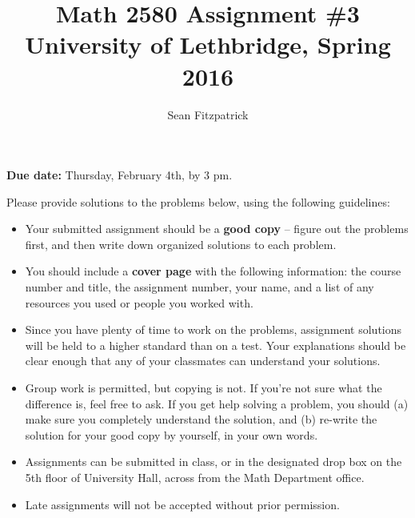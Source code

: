 \documentclass[letterpaper,12pt]{article}
\title{Math 2580 Assignment \#3\\University of Lethbridge, Spring 2016}
\author{Sean Fitzpatrick}
\begin{document}
 \maketitle

{\bf Due date:} Thursday, February 4th, by 3 pm.

\bigskip

Please provide solutions to the problems below, using the following guidelines:
\begin{itemize}
\item Your submitted assignment should be a {\bf good copy} -- figure out the problems first, and then write down organized solutions to each problem. 
\item You should include a {\bf cover page} with the following information: the course number and title, the assignment number, your name, and a list of any resources you used or people you worked with.
\item Since you have plenty of time to work on the problems, assignment solutions will be held to a higher standard than on a test. Your explanations should be clear enough that any of your classmates can understand your solutions.
\item Group work is permitted, but copying is not. If you're not sure what the difference is, feel free to ask. If you get help solving a problem, you should (a) make sure you completely understand the solution, and (b) re-write the solution for your good copy by yourself, in your own words.
\item Assignments can be submitted in class, or in the designated drop box on the 5th floor of University Hall, across from the Math Department office.
\item Late assignments will not be accepted without prior permission.

\end{itemize}
\newpage
\end{document}
